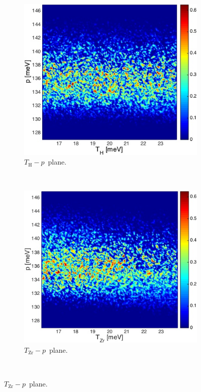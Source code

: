 \documentclass[review]{elsarticle}
\begin{document}
\begin{figure}[ht!]
\begin{subfigure}{0.5\textwidth}
\centering
\includegraphics[width=0.9\linewidth]{NSE15-48R1_Figure11c.jpg}
\caption{$T_\mathrm{H}-p$~plane.}
\end{subfigure}
~
\begin{subfigure}{0.5\textwidth}
\centering
\includegraphics[width=0.9\linewidth]{NSE15-48R1_Figure11d.jpg}
\caption{$T_\mathrm{Zr}-p$~plane.}
\end{subfigure}\\


\end{figure}
\end{document}
